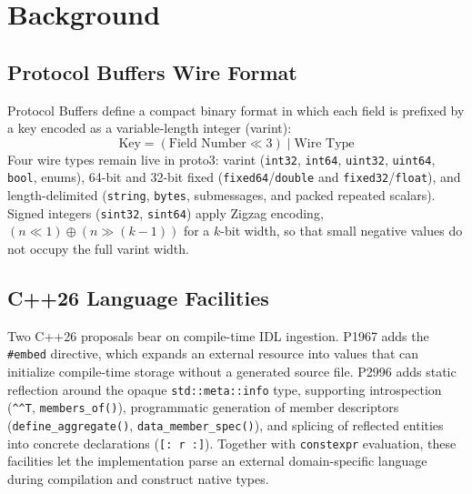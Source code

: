 \section{Background}

\subsection{Protocol Buffers Wire Format}
Protocol Buffers define a compact binary format in which each field is prefixed by a key encoded as a variable-length integer (varint):
\begin{equation}
\text{Key} = (\text{Field Number} \ll 3) \mid \text{Wire Type}
\label{eq:wire_key}
\end{equation}
Four wire types remain live in proto3: varint (\texttt{int32}, \texttt{int64}, \texttt{uint32}, \texttt{uint64}, \texttt{bool}, enums), 64-bit and 32-bit fixed (\texttt{fixed64}/\texttt{double} and \texttt{fixed32}/\texttt{float}), and length-delimited (\texttt{string}, \texttt{bytes}, submessages, and packed repeated scalars). Signed integers (\texttt{sint32}, \texttt{sint64}) apply Zigzag encoding, $(n \ll 1) \oplus (n \gg (k - 1))$ for a $k$-bit width, so that small negative values do not occupy the full varint width.

\subsection{C++26 Language Facilities}
Two C++26 proposals bear on compile-time IDL ingestion. P1967 \cite{p1967} adds the \texttt{\#embed} directive, which expands an external resource into values that can initialize compile-time storage without a generated source file. P2996 \cite{p2996} adds static reflection around the opaque \texttt{std::meta::info} type, supporting introspection (\texttt{\^{}\^{}T}, \texttt{members\_of()}), programmatic generation of member descriptors (\texttt{define\_aggregate()}, \texttt{data\_member\_spec()}), and splicing of reflected entities into concrete declarations (\texttt{[: r :]}). Together with \texttt{constexpr} evaluation, these facilities let the implementation parse an external domain-specific language during compilation and construct native types.
